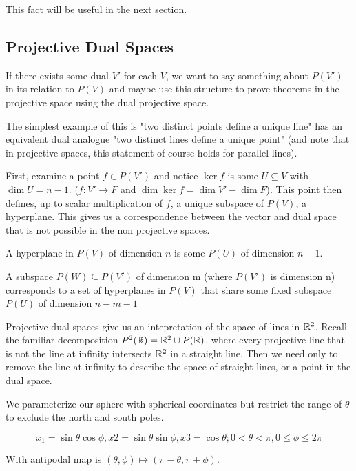 \documentclass[10pt]{article}
\begin{document}
This fact will be useful in the next section.

\subsection{Projective Dual Spaces}

If there exists some dual $V'$ for each $V$, we want to say something about
$P(V')$ in its relation to $P(V)$ and maybe use this structure to prove
theorems in the projective space using the dual projective space. 

The simplest example of this is "two distinct points define a unique line" has
an equivalent dual analogue "two distinct lines define a unique point" (and note that in
projective spaces, this statement of course holds for parallel lines).

First, examine a point $f \in P(V')$ and notice $\ker f$ is some $U \subseteq
V$ with $\dim U = n-1$. ($f: V' \to F$ and $\dim \ker f = \dim V' - \dim F$).
This point then defines, up to scalar multiplication of $f$, a unique subspace
of $P(V)$, a hyperplane. This gives us a correspondence between the vector and dual space that is
not possible in the non projective spaces.

\begin{definition}
	A hyperplane in $P(V)$ of dimension $n$ is some $P(U)$ of dimension $n-1$.
\end{definition}

\begin{theorem}
	A subspace $P(W)\subseteq P(V')$ of dimension m (where $P(V')$ is dimension
	n) corresponds to a set of hyperplanes in $P(V)$ that share some fixed
	subspace $P(U)$ of dimension $n - m - 1$
\end{theorem}

Projective dual spaces give us an intepretation of the space of lines in $\mathbb{R}^2$.
Recall the familiar decomposition $P^2(\mathbb{R}) = \mathbb{R}^2 \cup P(\mathbb{R})$, where every
projective line that is not the line at infinity intersects $\mathbb{R}^2$ in a
straight line. Then we need only to remove the line at infinity to describe the
space of straight lines, or a point in the dual space.

We parameterize our sphere with spherical coordinates but restrict the range of
$\theta$ to exclude the north and south poles.

\[x_1 = \sin\theta\cos\phi, x2 = \sin\theta\sin\phi, x3 = \cos\theta ; 0 <
\theta < \pi, 0  \leq \phi \leq 2\pi \]

With antipodal map is $(\theta, \phi) \mapsto (\pi - \theta, \pi + \phi)$.
\end{document}
